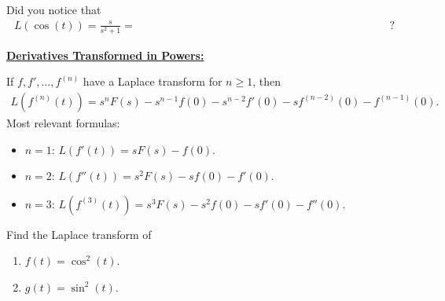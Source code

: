 \documentclass[12pt,a4paper]{article}
\newcounter{example}[section]
\begin{document}
	\newpage
	
	Did you notice that
		\begin{align*}
		L (\cos (t)) = \frac{s}{s^2 + 1} = \phantom{s L (\sin (t)) - \sin (0) 2222222222222222222222} ?
		\end{align*}
		
	\vspace*{16pt}
	
	\underline{\textbf{Derivatives Transformed in Powers:}}
	
	If $f, f', \ldots , f^{(n)}$ have a Laplace transform for $n \geq 1$, then
		\begin{align*}
		L ( f^{(n)} (t)) = s^n F(s) - s^{n - 1} f(0) - s^{n - 2} f ' (0) - s f^{(n-2)}(0) - f^{(n-1)}(0) .
		\end{align*}
	Most relevant formulas:
		\begin{itemize}
		\item $n = 1$: $L (f'(t)) = s F(s) - f(0)$.
		\item $n = 2$: $L (f''(t)) = s^2 F(s) - s f(0) - f'(0)$.
		\item $n = 3$: $L(f^{(3)} (t)) = s^3 F(s) - s^2 f(0) - s f'(0) - f''(0)$.
		\end{itemize}
		
	\vspace*{16pt}
	
	\begin{example}
	Find the Laplace transform of
		\begin{enumerate}[label=\textbf{(\alph*)}]
		\item $f(t) = \cos^2 (t)$.
		\item $g(t) = \sin^2 (t)$.
		\end{enumerate}
	\end{example}
\end{document}
